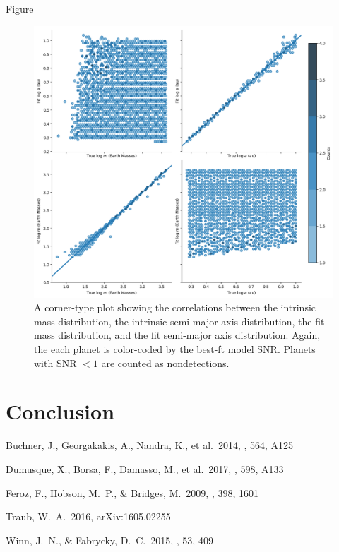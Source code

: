 \documentclass[12pt,manuscript]{aastex}
\begin{document}
Figure
% 


\begin{figure}
  \centering
  \includegraphics[width=0.9\linewidth]{../figures/planets3_correlations}
  \caption{A corner-type plot showing the correlations between the intrinsic mass distribution, the intrinsic semi-major axis distribution, the fit mass distribution, and the fit semi-major axis distribution. Again, the each planet is color-coded by the best-ft model SNR. Planets with SNR $< 1$ are counted as nondetections.}
  \label{fig: correlations}
\end{figure}


\section{Conclusion}
\label{section: conclusion}

\begin{thebibliography}{}

 Buchner, J., Georgakakis, A., Nandra, K., et al.\ 2014, \aap, 564, A125

 Dumusque, X., Borsa, F., Damasso, M., et al.\ 2017, \aap, 598, A133 

 Feroz, F., Hobson, M.~P., \& Bridges, M.\ 2009, \mnras, 398, 1601 

 Traub, W.~A.\ 2016, arXiv:1605.02255 

 Winn, J.~N., \& Fabrycky, D.~C.\ 2015, \araa, 53, 409 

\end{thebibliography}

 
\end{document}
